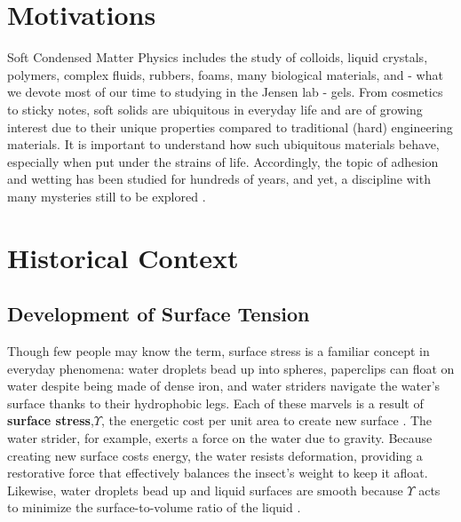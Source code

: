 

\section{Motivations}
Soft Condensed Matter Physics includes the study of colloids, liquid crystals, polymers, complex fluids, rubbers, foams, many biological materials, and - what we devote most of our time to studying in the Jensen lab - gels. From cosmetics to sticky notes, soft solids are ubiquitous in everyday life and are of growing interest due to their unique properties compared to traditional (hard) engineering materials.  It is important to understand how such ubiquitous materials behave, especially when put under the strains of life. Accordingly, the topic of adhesion and wetting has been studied for hundreds of years, and yet, a discipline with many mysteries still to be explored  \cite{GennesPierre-Gillesde2003Cawp}. 

 
\section{Historical Context}
\subsection{Development of Surface Tension}
Though few people may know the term, surface stress is a familiar concept in everyday phenomena: water droplets bead up into spheres, paperclips can float on water despite being made of dense iron, and water striders navigate the water's surface thanks to their hydrophobic legs. Each of these marvels is a result of \textbf{surface stress},$\Upsilon$, the  energetic cost per unit area to create new surface \cite{cammarata1994surface}. The water strider, for example, exerts a force on the water due to gravity. Because creating new surface costs energy, the water resists deformation, providing a restorative force that effectively balances the insect’s weight to keep it afloat. Likewise, water droplets bead up and liquid surfaces are smooth because $\Upsilon$ acts to minimize the surface-to-volume ratio of the liquid \cite{gibbs1906scientific,GennesPierre-Gillesde2003Cawp}. 

